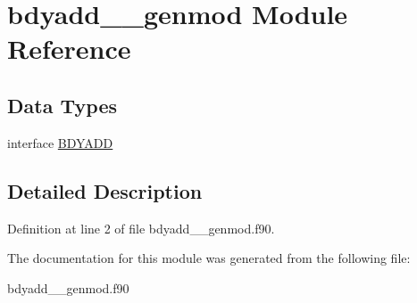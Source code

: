 \hypertarget{classbdyadd____genmod}{\section{bdyadd\+\_\+\+\_\+genmod Module Reference}
\label{classbdyadd____genmod}
}
\subsection*{Data Types}
\begin{DoxyCompactItemize}
\item 
interface \hyperlink{interfacebdyadd____genmod_1_1_b_d_y_a_d_d}{B\+D\+Y\+A\+D\+D}
\end{DoxyCompactItemize}


\subsection{Detailed Description}


Definition at line 2 of file bdyadd\+\_\+\+\_\+genmod.\+f90.



The documentation for this module was generated from the following file\+:\begin{DoxyCompactItemize}
\item 
bdyadd\+\_\+\+\_\+genmod.\+f90\end{DoxyCompactItemize}
